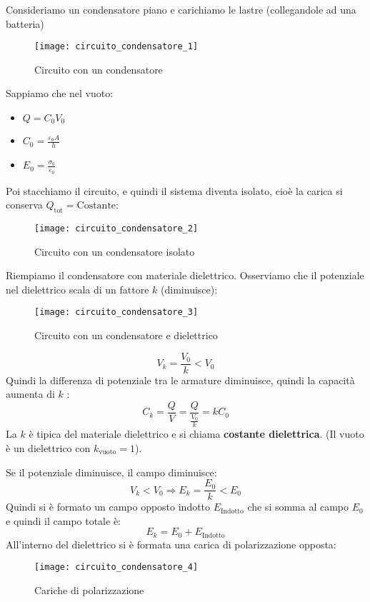 \documentclass[a4paper]{article}
\begin{document}
\begin{exercise}
  Consideriamo un condensatore piano e carichiamo le lastre (collegandole ad una batteria)
  \begin{figure}[H]
    \centering
    \texttt{[image: circuito\_condensatore\_1]}
    \caption{Circuito con un condensatore}
  \end{figure}
  \noindent
  Sappiamo che nel vuoto:
  \begin{itemize}
    \item \( Q = C_0 V_0 \) 
    \item \( C_0 = \frac{\varepsilon_0 A}{h} \)
    \item \( E_0 = \frac{\sigma_0}{\varepsilon_0} \) 
  \end{itemize}
  Poi stacchiamo il circuito, e quindi il sistema diventa isolato, cioè la carica si
  conserva \( Q_{\text{tot}} = \text{Costante} \):
  \begin{figure}[H]
    \centering
    \texttt{[image: circuito\_condensatore\_2]}
    \caption{Circuito con un condensatore isolato}
  \end{figure}
  \noindent
  Riempiamo il condensatore con materiale dielettrico. Osserviamo che il potenziale
  nel dielettrico scala di un fattore \( k \) (diminuisce):
  \begin{figure}[H]
    \centering
    \texttt{[image: circuito\_condensatore\_3]}
    \caption{Circuito con un condensatore e dielettrico}
  \end{figure}
  \[
    V_k = \frac{V_0}{k} < V_0
  \] 
  Quindi la differenza di potenziale tra le armature diminuisce, quindi
  la capacità aumenta di \( k \) :
  \[
    C_k = \frac{Q}{V} = \frac{Q}{\frac{V_0}{k}} = k C_0
  \]
  La \( k \) è tipica del materiale dielettrico e si chiama \textbf{costante dielettrica}.
  (Il vuoto è un dielettrico con \( k_{\text{vuoto}} = 1 \)).

  \vspace{1em}
  \noindent
  Se il potenziale diminuisce, il campo diminuisce:
  \[
    V_k < V_0 \Rightarrow E_k = \frac{E_0}{k} < E_0
  \] 
  Quindi si è formato un campo opposto indotto \( E_{\text{Indotto}} \) che si somma
  al campo \( E_0 \) e quindi il campo totale è:
  \[
    E_{k} = E_0 + E_{\text{Indotto}}
  \]
  All'interno del dielettrico si è formata una carica di polarizzazione opposta:
  \begin{figure}[H]
    \centering
    \texttt{[image: circuito\_condensatore\_4]}
    \caption{Cariche di polarizzazione}
  \end{figure}
\end{exercise}
\end{document}
